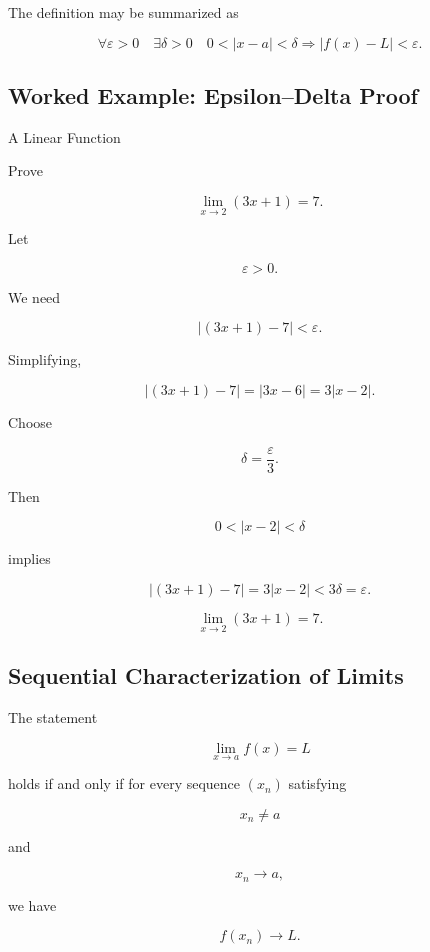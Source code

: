 The definition may be summarized as

\[
\boxed{
\forall\varepsilon>0
\quad
\exists\delta>0
\quad
0<|x-a|<\delta
\Rightarrow
|f(x)-L|<\varepsilon.
}
\]

\subsection{Worked Example: Epsilon--Delta Proof}
\label{subsec:worked-epsilon-delta}

\begin{workedexamplebox}{A Linear Function}

Prove

\[
\lim_{x\to2}(3x+1)=7.
\]

Let

\[
\varepsilon>0.
\]

We need

\[
|(3x+1)-7|<\varepsilon.
\]

Simplifying,

\[
|(3x+1)-7|
=
|3x-6|
=
3|x-2|.
\]

Choose

\[
\delta=\frac{\varepsilon}{3}.
\]

Then

\[
0<|x-2|<\delta
\]

implies

\[
|(3x+1)-7|
=
3|x-2|
<
3\delta
=
\varepsilon.
\]

\begin{answerbox}
\[
\boxed{
\lim_{x\to2}(3x+1)=7.
}
\]
\end{answerbox}
\end{workedexamplebox}

\subsection{Sequential Characterization of Limits}
\label{subsec:sequential-characterization-limits}

\begin{theorem}
The statement

\[
\lim_{x\to a}f(x)=L
\]

holds if and only if for every sequence \((x_n)\) satisfying

\[
x_n\neq a
\]

and

\[
x_n\to a,
\]

we have

\[
\boxed{
f(x_n)\to L.
}
\]
\end{theorem}

